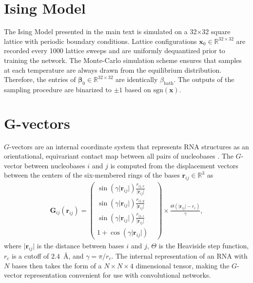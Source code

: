 \section{Ising Model}
\label{ch4:app:tm-ising}

The Ising Model presented in the main text is simulated on a 32$\times$32 square lattice with periodic boundary conditions. Lattice configurations $\mathbf{x}_0\in\mathbb{R}^{32\times32}$ are recorded every 1000 lattice sweeps and are uniformly dequantized prior to training the network. The Monte-Carlo simulation scheme ensures that samples at each temperature are always drawn from the equilibrium distribution. Therefore, the entries of $\bm{\beta}_0\in\mathbb{R}^{32\times32}$ are identically $\beta_{\mathrm{bath}}$. The outputs of the sampling procedure are binarized to $\pm 1$ based on $\mathrm{sgn}(\mathbf{x})$.

\section{$\mathbf{G}$-vectors}
\label{ch4:app:g-vectors}

$G$-vectors are an internal coordinate system that represents RNA structures as an orientational, equivariant contact map between all pairs of nucleobases \cite{gvecs-bussi}. The $G$-vector between nucleobases $i$ and $j$ is computed from the displacement vectors between the centers of the six-membered rings of the bases $\mathbf{r}_{ij} \in \mathbb{R}^3$ as
\begin{gather}
    \mathbf{G}_{ij}(\mathbf{r}_{ij}) =
    \begin{pmatrix}
    \sin (\gamma \lvert \mathbf{r}_{ij}\rvert)\frac{r_{ij,x}}{\lvert \mathbf{r}_{ij}\rvert} & \\
    \sin (\gamma \lvert \mathbf{r}_{ij}\rvert)\frac{r_{ij,y}}{\lvert \mathbf{r}_{ij}\rvert} & \\
    \sin (\gamma \lvert \mathbf{r}_{ij}\rvert)\frac{r_{ij,z}}{\lvert \mathbf{r}_{ij}\rvert} &  \\
    1 + \cos (\gamma \lvert \mathbf{r}_{ij}\rvert)
    \end{pmatrix}
    \times \frac{\Theta (\lvert \mathbf{r}_{ij}\rvert - r_c)}{\gamma},
\end{gather}
where $\lvert \mathbf{r}_{ij}\rvert$ is the distance between bases $i$ and $j$, $\Theta$ is the Heaviside step function, $r_c$ is a cutoff of $2.4$~\AA, and $\gamma=\pi/r_c$. The internal representation of an RNA with $N$ bases then takes the form of a $N \times N \times 4$ dimensional tensor, making the $G$-vector representation convenient for use with convolutional networks.

